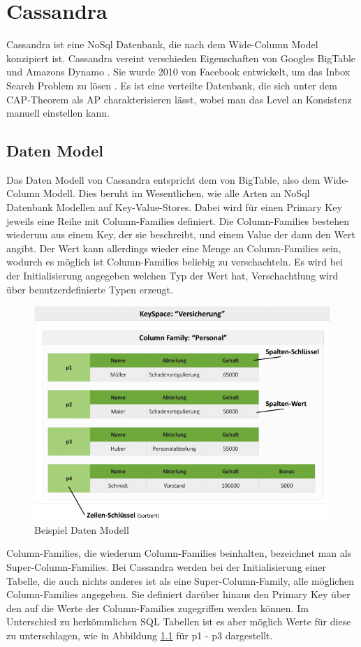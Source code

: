 \chapter{Cassandra}
\label{appendix:Cassandra}
Cassandra ist eine NoSql Datenbank, die nach dem Wide-Column Model konzipiert ist. Cassandra vereint verschieden Eigenschaften von Googles BigTable \cite{bigtable} und Amazons Dynamo \cite{dynamo}. Sie wurde 2010 von Facebook entwickelt, um das Inbox Search Problem zu lösen \cite{cassandra}. Es ist eine verteilte Datenbank, die sich unter dem CAP-Theorem als AP charakterisieren lässt, wobei man das Level an Konsistenz manuell einstellen kann.

\section{Daten Model}
\label{sec:DM}
Das Daten Modell von Cassandra entspricht dem von BigTable, also dem Wide-Column Modell. Dies beruht im Wesentlichen, wie alle Arten an NoSql Datenbank Modellen auf Key-Value-Stores. Dabei wird für einen Primary Key jeweils eine Reihe mit Column-Families definiert. Die Column-Families bestehen wiederum aus einem Key, der sie beschreibt, und einem Value der dann den Wert angibt. Der Wert kann allerdings wieder eine Menge an Column-Families sein, wodurch es möglich ist Column-Families beliebig zu verschachteln. Es wird bei der Initialisierung angegeben welchen Typ der Wert hat, Verschachtlung wird über benutzerdefinierte Typen erzeugt.
\begin{figure}[htbp!]
	\centering
	\includegraphics[scale=0.45]{pics/colfam.png}
	\caption{Beispiel Daten Modell}
	\label{fig:bspDM}
\end{figure} Column-Families, die wiederum Column-Families beinhalten, bezeichnet man als Super-Column-Families. Bei Cassandra werden bei der Initialisierung einer Tabelle, die auch nichts anderes ist als eine Super-Column-Family, alle möglichen Column-Families angegeben. Sie definiert darüber hinaus den Primary Key über den auf die Werte der Column-Families zugegriffen werden können. Im Unterschied zu herkömmlichen SQL Tabellen ist es aber möglich Werte für diese zu unterschlagen, wie in Abbildung \ref{fig:bspDM} für p1 - p3 dargestellt.\\ 
